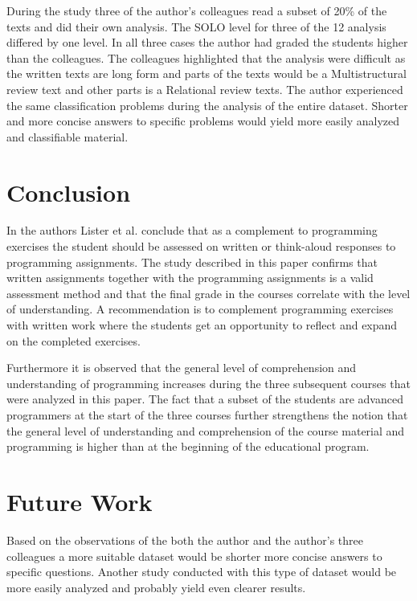 \documentclass[twoside,twocolumn,a4paper,11pt,english]{article}
\begin{document}
During the study three of the author's colleagues read a subset of 20\% of the texts and did their own analysis. The SOLO level for three of the 12 analysis differed by one level. In all three cases the author had graded the students higher than the colleagues. The colleagues highlighted that the analysis were difficult as the written texts are long form and parts of the texts would be a Multistructural review text and other parts is a Relational review texts. The author experienced the same classification problems during the analysis of the entire dataset. Shorter and more concise answers to specific problems would yield more easily analyzed and classifiable material.




\section{Conclusion}

In \cite{lister2006not} the authors Lister et al. conclude that as a complement to programming exercises the student should be assessed on written or think-aloud responses to programming assignments. The study described in this paper confirms that written assignments together with the programming assignments is a valid assessment method and that the final grade in the courses correlate with the level of understanding. A recommendation is to complement programming exercises with written work where the students get an opportunity to reflect and expand on the completed exercises.

Furthermore it is observed that the general level of comprehension and understanding of programming increases during the three subsequent courses that were analyzed in this paper. The fact that a subset of the students are advanced programmers at the start of the three courses further strengthens the notion that the general level of understanding and comprehension of the course material and programming is higher than at the beginning of the educational program.




\section{Future Work}

Based on the observations of the both the author and the author's three colleagues a more suitable dataset would be shorter more concise answers to specific questions. Another study conducted with this type of dataset would be more easily analyzed and probably yield even clearer results.
\end{document}
